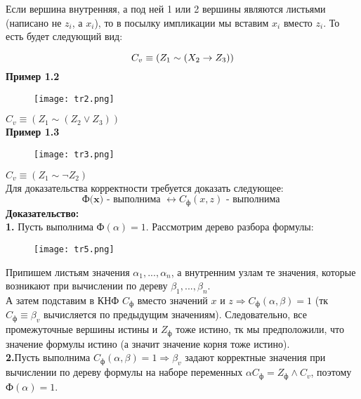 Если вершина внутренняя, а под ней 1 или 2 вершины являются листьями (написано не $z_i$, а $x_i$), то в посылку импликации мы вставим $x_i$ вместо $z_i$. То есть будет следующий вид:

\[
C_v \equiv (Z_1 \sim (X_2 \to Z_3))\\
\]
\textbf{Пример 1.2}\\
\begin{figure}[!h]
	\texttt{[image: tr2.png]}
\end{figure}
$C_v \equiv (Z_1 \sim (Z_2 \vee Z_3))$\\
\textbf{Пример 1.3}\\
\begin{figure}[!h]
	\texttt{[image: tr3.png]}
\end{figure}
$C_v \equiv (Z_1 \sim \neg Z_2 )$\\
Для доказательства корректности требуется доказать следующее:
\[
\textbf{Ф(x) - выполнима $\leftrightarrow C_{\text{ф}}(x,z)$ - выполнима }
\]
\newpage
\textbf{Доказательство:}\\
\textbf{1.} Пусть выполнима Ф$(\alpha) = 1$. Рассмотрим дерево разбора формулы:\\
\bigskip
\begin{figure}[h!]
	\center\texttt{[image: tr5.png]}
\end{figure}

Припишем листьям значения $\alpha_1,...,\alpha_n$, а внутренним узлам те значения, которые возникают при вычислении по дереву $\beta_1,...,\beta_n$.\\
А затем подставим в КНФ $C_{\text{ф}}$ вместо значений $x$ и $z\Rightarrow C_{\text{ф}}(\alpha , \beta)=1 $ (тк $C_{\text{ф}} \equiv \beta_v$ вычисляется по предыдущим значениям). Следовательно, все промежуточные вершины истины и $Z_{\text{ф}}$ тоже истино, тк мы предположили, что значение формулы истино (а значит значение корня тоже истино).\\
\textbf{2.}Пусть выполнима $C_{\text{ф}}(\alpha , \beta)=1 \Rightarrow \beta_v$ задают корректные значения при вычислении по дереву формулы на наборе переменных $\alpha C_{\text{ф}}= Z_{\text{ф}} \wedge C_v $, поэтому Ф$(\alpha) = 1$.
